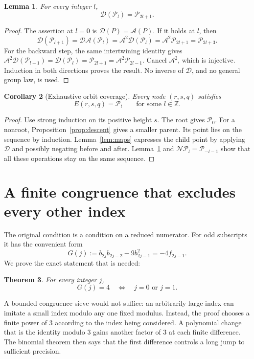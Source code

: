 \documentclass[11pt,a4paper]{article}
\newtheorem{theorem}{Theorem}[section]
\newtheorem{lemma}[theorem]{Lemma}
\newtheorem{corollary}[theorem]{Corollary}
\theoremstyle{definition}
\newcommand{\Z}{\mathbb Z}
\newcommand{\pp}{\mathcal P}
\newcommand{\NN}{\mathcal N}
\renewcommand{\AA}{\mathcal A}
\newcommand{\DD}{\mathcal D}
\begin{document}
\begin{lemma}\label{lem:binaryindex}
For every integer \(l\),
\[
 \DD(\pp_l)=\pp_{2l+1}.
\]
\end{lemma}
\begin{proof}
The assertion at \(l=0\) is \(\DD(P)=\AA(P)\).
If it holds at \(l\), then
\[
 \DD(\pp_{l+1})=\DD\AA(\pp_l)
 =\AA^2\DD(\pp_l)=\AA^2\pp_{2l+1}=\pp_{2l+3}.
\]
For the backward step, the same intertwining identity gives
\(\AA^2\DD(\pp_{l-1})=\DD(\pp_l)=\pp_{2l+1}
=\AA^2\pp_{2l-1}\). Cancel \(\AA^2\), which is injective.
Induction in both directions proves the result. No inverse of
\(\DD\), and no general group law, is used.
\end{proof}

\begin{corollary}[Exhaustive orbit coverage]\label{cor:coverage}
Every node \((r,s,q)\) satisfies
\[
 E(r,s,q)=\pp_l\qquad\text{for some }l\in\Z.
\]
\end{corollary}
\begin{proof}
Use strong induction on its positive height \(s\). The root gives
\(\pp_0\). For a nonroot, Proposition~\ref{prop:descent} gives a
smaller parent. Its point lies on the sequence by induction.
Lemma~\ref{lem:maps} expresses the child point by applying \(\DD\)
and possibly negating before and after. Lemma~\ref{lem:binaryindex}
and \(\NN\pp_l=\pp_{-l-1}\) show that all these operations stay
on the same sequence.
\end{proof}

\section{A finite congruence that excludes every other index}\label{sec:congruence}

The original condition is a condition on a reduced numerator.
For odd subscripts it has the convenient form
\begin{equation}\label{eq:G}
 G(j):=b_{2j}b_{2j-2}-9b_{2j-1}^2=-4f_{2j-1}.
\end{equation}
We prove the exact statement that is needed:
\begin{theorem}\label{thm:G}
For every integer \(j\),
\[
 G(j)=4\quad\Longleftrightarrow\quad j=0\text{ or }j=1.
\]
\end{theorem}

A bounded congruence sieve would not suffice: an arbitrarily large
index can imitate a small index modulo any one fixed modulus.
Instead, the proof chooses a finite power of \(3\) according to
the index being considered. A polynomial change that is the identity
modulo \(3\) gains another factor of \(3\) at each finite difference.
The binomial theorem then says that the first difference controls a
long jump to sufficient precision.
\end{document}
